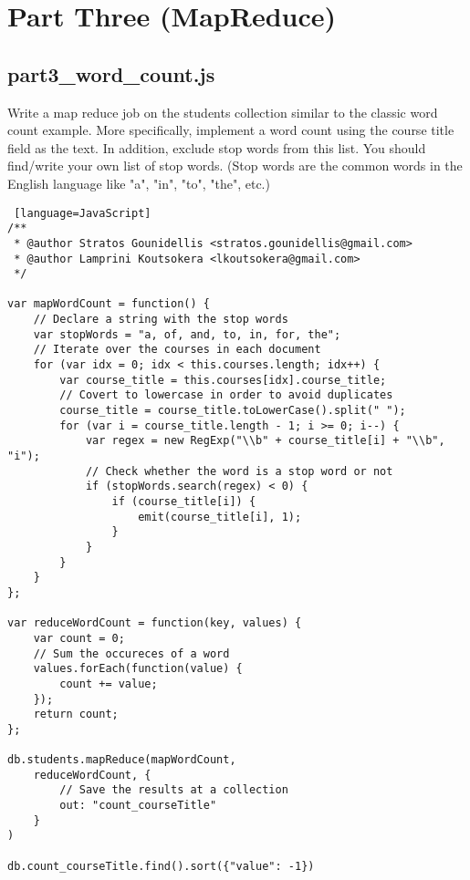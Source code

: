 \documentclass[11pt]{article}
\begin{document}
\section{Part Three (MapReduce)}\label{Part Three (MapReduce)}

\subsection{part3\_word\_count.js}\label{part3wordcount.js}
\noindent
Write a map reduce job on the students collection similar to the classic word count example. More specifically, implement a word count using the course title field as the text. In addition, exclude stop words from this list. You should find/write your own list of stop words. (Stop words are the common words in the English language like "a", "in", "to", "the", etc.)
\begin{lstlisting} [language=JavaScript]
/**
 * @author Stratos Gounidellis <stratos.gounidellis@gmail.com>
 * @author Lamprini Koutsokera <lkoutsokera@gmail.com>
 */
 
var mapWordCount = function() {
    // Declare a string with the stop words
    var stopWords = "a, of, and, to, in, for, the";
    // Iterate over the courses in each document
    for (var idx = 0; idx < this.courses.length; idx++) {
        var course_title = this.courses[idx].course_title;
        // Covert to lowercase in order to avoid duplicates
        course_title = course_title.toLowerCase().split(" ");
        for (var i = course_title.length - 1; i >= 0; i--) {
            var regex = new RegExp("\\b" + course_title[i] + "\\b", "i");
            // Check whether the word is a stop word or not
            if (stopWords.search(regex) < 0) {
                if (course_title[i]) {
                    emit(course_title[i], 1);
                }
            }
        }
    }
};

var reduceWordCount = function(key, values) {
    var count = 0;
    // Sum the occureces of a word
    values.forEach(function(value) {
        count += value;
    });
    return count;
};

db.students.mapReduce(mapWordCount,
    reduceWordCount, {
        // Save the results at a collection
        out: "count_courseTitle"
    }
)

db.count_courseTitle.find().sort({"value": -1})
\end{lstlisting}
\end{document}
